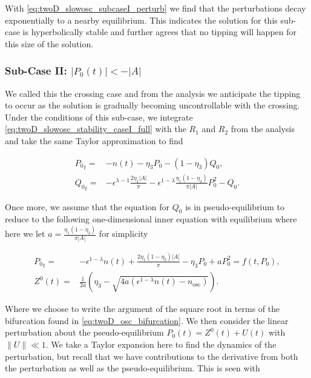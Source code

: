 With \eqref{eq:twoD_slowosc_subcaseI_perturb} we find that the perturbations decay exponentially to a nearby equilibrium. This indicates the solution for this sub-case is hyperbolically stable and further agrees that no tipping will happen for this size of the solution.

\subsubsection{Sub-Case II: $|P_0(t)|<-|A|$}

We called this the crossing case and from the analysis we anticipate the tipping to occur as the solution is gradually becoming uncontrollable with the crossing. Under the conditions of this sub-case, we integrate \eqref{eq:twoD_slowosc_stability_caseI_full} with the $R_1$ and $R_2$ from the analysis and take the same Taylor approximation to find 

\begin{equation}\label{eq:twoD_slowosc_stability_subcaseII,full}
\begin{aligned}
{P_0}_t =& -n(t)-\eta_3 P_0-(1-\eta_3)Q_0,\\
{Q_0}_t =&-\epsilon^{\lambda-1}\frac{2\eta_1|A|}{\pi}-\epsilon^{1-\lambda}\frac{\eta_1(1-\eta_3)}{\pi|A|}P_0^2-Q_0.
\end{aligned}
\end{equation}

Once more, we assume that the equation for $Q_0$ is in pseudo-equilibrium 
to reduce to the following one-dimensional inner equation with equilibrium where here we let $a=\frac{\eta_1(1-\eta_3)}{\pi|A|}$ for simplicity

\begin{equation}\label{eq:twoD_slowosc_stability_subcaseII,reduced}
\begin{aligned}
{P_0}_t =& -\epsilon^{1-\lambda}n(t)+\frac{2\eta_1(1-\eta_3)|A|}{\pi}-\eta_3 P_0+aP_0^2=f(t,P_0),\\
Z^0(t) =& \frac{1}{2a}\left(\eta_3-\sqrt{4a(\epsilon^{1-\lambda}n(t)-n_{\text{osc}})}\right).
\end{aligned}
\end{equation}

Where we choose to write the argument of the square root in terms of the bifurcation found in \eqref{eq:twoD_osc_bifurcation}. We then consider the linear perturbation about the pseudo-equilibrium $P_0(t)= Z^0(t)+U(t)$ with $\lVert U\rVert \ll 1$. We take a Taylor expansion here to find the dynamics of the perturbation, but recall that we have contributions to the derivative from both the perturbation as well as the pseudo-equilibrium. This is seen with

